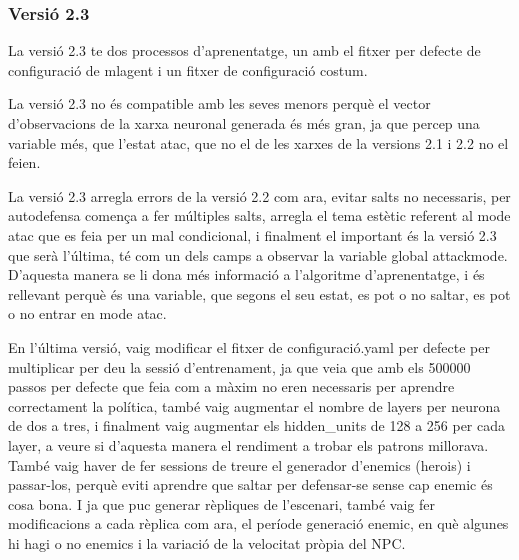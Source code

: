 \documentclass{article}
\begin{document}
     \newpage
     
     \subsubsection{Versió 2.3}
    La versió 2.3 te dos processos d'aprenentatge, un amb el fitxer per defecte de configuració de mlagent i un fitxer de configuració costum.

    La versió 2.3 no és compatible amb les seves menors perquè el vector d'observacions de la xarxa neuronal generada és més gran, ja que percep una variable més, que l'estat atac, que no el de les xarxes de la versions 2.1 i 2.2 no el feien.
    
    La versió 2.3 arregla errors de la versió 2.2 com ara, evitar salts no necessaris, per autodefensa comença a fer múltiples salts, arregla el tema estètic referent al mode atac que es feia per un mal condicional, i finalment el important és la versió 2.3 que serà l'última, té com un dels camps a observar la variable global attackmode. D'aquesta manera se li dona més informació a l'algoritme d'aprenentatge, i és rellevant perquè és una variable, que segons el seu estat, es pot o no saltar, es pot o no entrar en mode atac.
    
    En l'última versió, vaig modificar el fitxer de configuració.yaml per defecte per multiplicar per deu la sessió d'entrenament, ja que veia que amb els 500000 passos per defecte que feia com a màxim no eren necessaris per aprendre correctament la política, també vaig augmentar el nombre de layers per neurona de dos a tres, i finalment vaig augmentar els hidden\_units de 128 a 256 per cada layer, a veure si d'aquesta manera el rendiment a trobar els patrons millorava. També vaig haver de fer sessions de treure el generador d'enemics (herois) i passar-los, perquè eviti aprendre que saltar per defensar-se sense cap enemic és cosa bona. I ja que puc generar rèpliques de l'escenari, també vaig fer modificacions a cada rèplica com ara, el període generació enemic, en què algunes hi hagi o no enemics i la variació de la velocitat pròpia del NPC.
    
\end{document}
